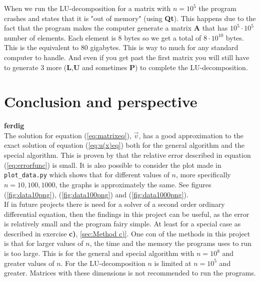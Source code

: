 \documentclass{article}
\begin{document}
  When we run the LU-decomposition for a matrix with $n = 10^5$ the program crashes and states that it is "out of memory" (using \textbf{Qt}). This happens due to the fact that the program makes the computer generate a matrix \textbf{A} that has $10^5 \cdot 10^5$ number of elements. Each element is 8 bytes so we get a total of $8 \cdot 10^{10}$ bytes. This is the equivalent to $80$ gigabytes. This is way to much for any standard computer to handle. And even if you get past the first matrix you will still have to generate 3 more (\textbf{L},\textbf{U} and sometimes \textbf{P}) to complete the LU-decomposition.



\vspace{1cm}

\section{Conclusion and perspective} \label{sec:Conclusion}

  {\bf ferdig} \\

  The solution for equation (\ref{eq:matrixeq}), $\vec{v}$, has a good approximation to the exact solution of equation (\ref{eq:u(x)eq}) both for the general algorithm and the special algorithm. This is proven by that the relative error described in equation (\ref{eq:errorfunc}) is small. It is also possible to consider the plot made in \texttt{plot\_data.py} which shows that for different values of $n$, more specifically $n = 10, 100, 1000$, the graphs is approximately the same. See figures (\ref{fig:data10png}),
  (\ref{fig:data100png}) and (\ref{fig:data1000png}). \\

  If in future projects there is need for a solver of a second order ordinary differential equation, then the findings in this project can be useful, as the error is relatively small and the program fairy simple. At least for a special case as described in exercise \textbf{c)}, \ref{sec:Method c)}. One con of the methods in this project is that for larger values of $n$, the time and the memory the programs uses to run is too large. This is for the general and special algorithm with $n = 10^8$ and greater values of $n$. For the LU-decomposition $n$ is limited at $n = 10^5$ and greater. Matrices with these dimensions is not recommended to run the programs.


\vspace{1cm}
\end{document}
